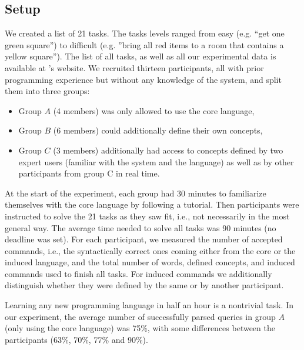 \subsection{Setup}
We created a list of 21 tasks. The tasks levels ranged from easy (e.g.
``get one green square'') to difficult (e.g. ''bring all red items to a
room that contains a yellow square''). The list of all tasks, as well as
all our experimental data is available at \tool's website.
%
We recruited thirteen participants, all with prior programming experience but without any
knowledge of the system, and split them into three groups:
\begin{itemize}
	\item Group $A$ (4 members) was only allowed to use the core language,

	\item Group $B$ (6 members) could additionally define their own concepts,

	\item Group $C$ (3 members) additionally had access to concepts defined by two
		expert users (familiar with the system and the language) as well as by other
		participants from group C in real time.
\end{itemize}
%
At the start of the experiment, each group had 30 minutes to familiarize themselves with the core language by following a tutorial. 
Then participants were instructed to solve the 21 tasks as they saw fit, i.e., not necessarily in the most general way.
The average time needed to solve all tasks was 90 minutes (no deadline was set). 
For each participant, we measured the number of accepted commands, i.e., the syntactically 
correct ones coming either from the core or the induced language,
and the total number of words, defined concepts, and induced commands used to finish all tasks. 
For induced commands we additionally distinguish whether they were defined by the same or by another participant.


Learning any new programming language in half an hour is a nontrivial task. In
our experiment, the average number of successfully parsed queries in group $A$
(only using the core language) was 75\%, with some differences between
the participants (63\%, 70\%, 77\% and 90\%).


